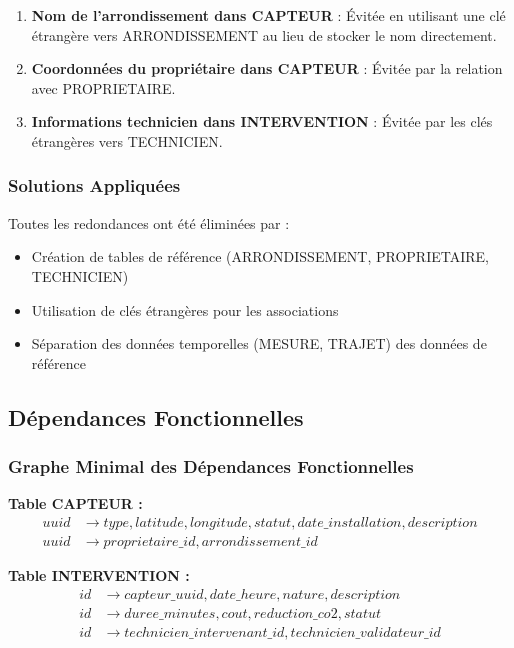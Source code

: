 \documentclass[12pt,a4paper]{article}
\begin{document}
\begin{enumerate}
    \item \textbf{Nom de l'arrondissement dans CAPTEUR} : Évitée en utilisant une clé étrangère vers ARRONDISSEMENT au lieu de stocker le nom directement.
    
    \item \textbf{Coordonnées du propriétaire dans CAPTEUR} : Évitée par la relation avec PROPRIETAIRE.
    
    \item \textbf{Informations technicien dans INTERVENTION} : Évitée par les clés étrangères vers TECHNICIEN.
\end{enumerate}

\subsubsection{Solutions Appliquées}

Toutes les redondances ont été éliminées par :
\begin{itemize}
    \item Création de tables de référence (ARRONDISSEMENT, PROPRIETAIRE, TECHNICIEN)
    \item Utilisation de clés étrangères pour les associations
    \item Séparation des données temporelles (MESURE, TRAJET) des données de référence
\end{itemize}

\subsection{Dépendances Fonctionnelles}

\subsubsection{Graphe Minimal des Dépendances Fonctionnelles}

\textbf{Table CAPTEUR :}
\begin{align*}
uuid &\rightarrow type, latitude, longitude, statut, date\_installation, description \\
uuid &\rightarrow proprietaire\_id, arrondissement\_id
\end{align*}

\textbf{Table INTERVENTION :}
\begin{align*}
id &\rightarrow capteur\_uuid, date\_heure, nature, description \\
id &\rightarrow duree\_minutes, cout, reduction\_co2, statut \\
id &\rightarrow technicien\_intervenant\_id, technicien\_validateur\_id
\end{align*}
\end{document}
